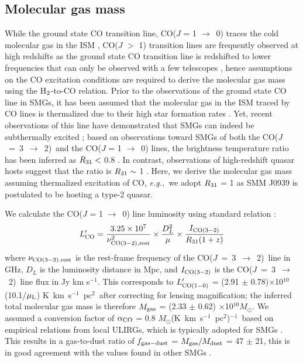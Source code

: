 \documentclass[twocolumn,apj,numberedappendix]{emulateapj}
\newcommand{\Msun}{\mbox{$M_{\odot}$}}
\newcommand{\rarr}{$\rightarrow$}
\newcommand{\CO}{\mbox{CO($J$ = 3 $\rightarrow$ 2) }}
\newcommand{\LpU}{\mbox{K km s$^{-1}$ pc$^2$}}
\newcommand{\eg}{{\sl e.g.,~}}
\newcommand{\pmOne}{$^{-1}$}
\begin{document}
\subsection{Molecular gas mass}
While the ground state CO transition line, CO($J$ = 1 \rarr\ 0) traces the cold molecular gas in the ISM
\citep*[\eg][]{Downes98a,Wilson70a}, CO($J$ $>$ 1) transition lines are frequently observed at high redshifts as the
 ground state CO transition line is redshifted to lower frequencies that can only be observed with a few telescopes 
 \citep{Carilli13a}, 
 hence assumptions on the CO excitation conditions are required to derive the molecular gas mass using the H$_{\rm 2}$-to-CO 
 relation. 
Prior to the observations of the ground state CO line in SMGs, it has been assumed that the molecular gas in the
  ISM traced by CO lines is thermalized due to their high star formation rates \citep[\eg][]{Greve05a, Coppin08a}.
   Yet, recent observations of this line have demonstrated that SMGs can indeed be subthermally excited
   \citep{Harris10a,Riechers11c,Riechers11d,Ivison11a}; based on observations toward SMGs of both the \CO and the CO($J$ = 1 \rarr\ 0) lines, the 
   brightness temperature ratio has been inferred as $R_{\rm 31}<$ 0.8 \citep
   {Harris10a,Carilli10a,Swinbank2010a,Riechers11d,Ivison11a,Ivison10d}. In contrast, observations of high-redshift quasar hosts suggest that the ratio 
   is $R_{\rm 31}\sim$ 1 \citep{Riechers06a, Riechers11a, Scott11a}. 
Here, we derive the molecular gas mass assuming thermalized excitation of CO, \eg we adopt $R_{\rm 31}$ = 1 as SMM J0939 is 
postulated to be hosting a type-2 quasar. \par
We calculate the CO($J$ = 1 \rarr\ 0) line luminosity using standard relation 
\citep[\eg][]{Solomon05a,Carilli13a}:
\begin{equation}
L^{\prime}_{\rm CO} = \frac{3.25\times10^7}{\nu_{\rm CO (3-2), rest}^2}\times \frac{D_L^2}{\mu} \times
\frac{I_{\rm CO(3-2)}} {R_{\rm 31} (1 + z)}
\end{equation}
where $\nu_{\rm CO (3-2), rest}$ is the rest-frame frequency of the \CO line in GHz, $D_L$ is the luminosity distance in Mpc, and $I_{\rm CO(3-2)}$ is the \CO line flux in Jy km s\pmOne. This corresponds to $L^{\prime}_{\rm CO (1-0)}$ = (2.91 $\pm$ 0.78)$\times$10$^{10}$(10.1/$\mu_{\rm L}$) \LpU\ after correcting for lensing magnification; the inferred total molecular gas mass is therefore $M_{\rm gas}$ = (2.33 $\pm$ 0.62) $\times$10$^{10}$\Msun. We assumed a conversion factor of $\alpha_{\rm CO}$ =
0.8 \Msun (\LpU)\pmOne\ based on empirical relations from local ULIRGs, which is typically
adopted for SMGs \citep[\eg][]{Tacconi06a,Tacconi08a,Bothwell13a}. 
This results in a gas-to-dust
ratio of $f_{\rm gas-dust}$ = $M_{\rm gas}/M_{\rm dust}$ = 47 $\pm$ 21, this is in good agreement with the 
values found in other SMGs \citep{Coppin08a,Micha10a,Riechers11c}.
\end{document}

